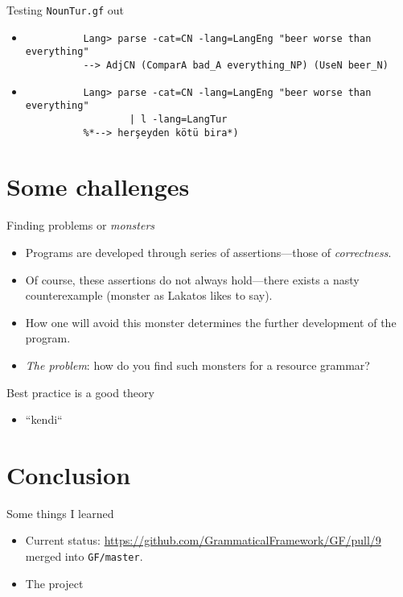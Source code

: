 \documentclass{beamer}
\begin{document}
  \begin{frame}[fragile]{Testing \texttt{NounTur.gf} out}
    \begin{itemize}
      \item<1->
        \begin{lstlisting}
          Lang> parse -cat=CN -lang=LangEng "beer worse than everything"
          --> AdjCN (ComparA bad_A everything_NP) (UseN beer_N)
        \end{lstlisting}
      \item<2->
        \begin{lstlisting}
          Lang> parse -cat=CN -lang=LangEng "beer worse than everything"
                  | l -lang=LangTur
          %*--> herşeyden kötü bira*)
        \end{lstlisting}
    \end{itemize}
  \end{frame}

  \section{Some challenges}

  \begin{frame}{Finding problems or \emph{monsters}}
    \begin{itemize}
      \item<1-> Programs are developed through series of assertions---those
        of \emph{correctness}.
      \item<2-> Of course, these assertions do not always hold---there exists a
        nasty counterexample (monster as Lakatos likes to say).
      \item<3-> How one will avoid this monster determines the further
        development of the program.
      \item<4-> \emph{The problem}: how do you find such monsters for a resource
        grammar?
    \end{itemize}
  \end{frame}

  \begin{frame}{Best practice is a good theory}
    \begin{itemize}
      \item<1-> ``kendi``
    \end{itemize}
  \end{frame}

  \section{Conclusion}

  \begin{frame}{Some things I learned}
    \begin{itemize}
      \item<1-> Current status:
        \href{first PR}{https://github.com/GrammaticalFramework/GF/pull/9}
        merged into \texttt{GF/master}.
      \item<2-> The project
    \end{itemize}
  \end{frame}
\end{document}
